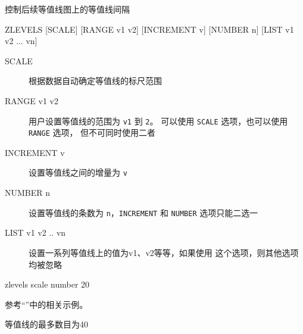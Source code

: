 \label{cmd:zlevels}

控制后续等值线图上的等值线间隔

\begin{SACSTX}
ZLEVELS [SCALE] [RANGE v1 v2] [INCREMENT v] [NUMBER n]
    [LIST v1 v2 ... vn]
\end{SACSTX}

\begin{description}
\item [SCALE] 根据数据自动确定等值线的标尺范围
\item [RANGE v1 v2] 用户设置等值线的范围为 \texttt{v1} 到 \texttt{2}。
    可以使用 \texttt{SCALE} 选项，也可以使用 \texttt{RANGE} 选项，
    但不可同时使用二者
\item [INCREMENT v] 设置等值线之间的增量为 \texttt{v}
\item [NUMBER n] 设置等值线的条数为 \texttt{n}，\texttt{INCREMENT} 和
    \texttt{NUMBER} 选项只能二选一
\item [LIST v1 v2 .. vn] 设置一系列等值线上的值为v1、v2等等，如果使用
    这个选项，则其他选项均被忽略
\end{description}

\begin{SACDFT}
zlevels scale number 20
\end{SACDFT}

参考``''中的相关示例。

等值线的最多数目为40
